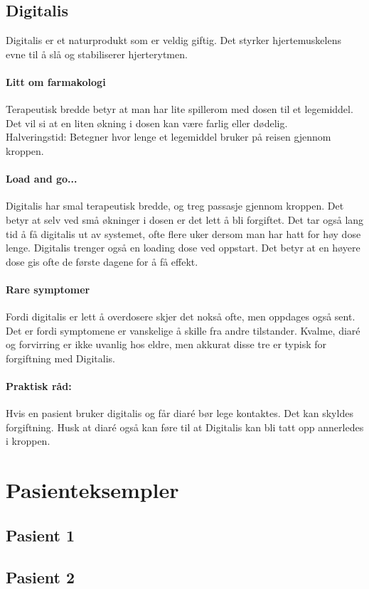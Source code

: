 			\subsection{Digitalis}
				Digitalis er et naturprodukt som er veldig giftig. Det styrker hjertemuskelens evne til å slå og stabiliserer hjerterytmen.
				\paragraph{Litt om farmakologi\\}
					Terapeutisk bredde betyr at man har lite spillerom med dosen til et legemiddel. Det vil si at en liten økning i dosen kan være farlig eller dødelig. \\
					Halveringstid: Betegner hvor lenge et legemiddel bruker på reisen gjennom kroppen.\\
				\paragraph{Load and go...\\}
					Digitalis har smal terapeutisk bredde, og treg passasje gjennom kroppen. Det betyr at selv ved små økninger i dosen er det lett å bli forgiftet. Det tar også lang tid å få digitalis ut av systemet, ofte flere uker dersom man har hatt for høy dose lenge. Digitalis trenger også en loading dose ved oppstart. Det betyr at en høyere dose gis ofte de første dagene for å få effekt.
				\paragraph{Rare symptomer\\}
					Fordi digitalis er lett å overdosere skjer det nokså ofte, men oppdages også sent. Det er fordi symptomene er vanskelige å skille fra andre tilstander. Kvalme, diaré og forvirring er ikke uvanlig hos eldre, men akkurat disse tre er typisk for forgiftning med Digitalis.
				\paragraph{Praktisk råd:\\}
					Hvis en pasient bruker digitalis og får diaré bør lege kontaktes. Det kan skyldes forgiftning. Husk at diaré også kan føre til at Digitalis kan bli tatt opp annerledes i kroppen.
		\section{Pasienteksempler}
			\subsection{Pasient 1}
			\subsection{Pasient 2}



\newpage